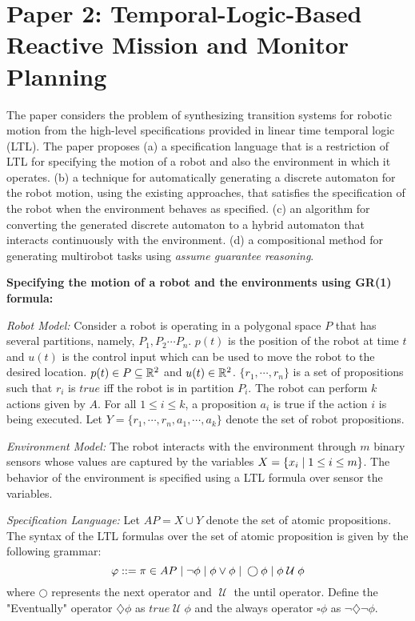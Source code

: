 \newcommand{\next}{\bigcirc}
\newcommand{\until}{\mathcal{\; U \;}}
\newcommand{\eventually}{\diamond}
\renewcommand{\eventually}{\diamondsuit}
\newcommand{\always}{\square}

\section{Paper 2: Temporal-Logic-Based Reactive Mission and Monitor Planning \cite{gazit:95}} \label{sec:paper2}

The paper considers the problem of synthesizing transition systems for robotic motion from the 
high-level specifications  provided in linear time temporal logic (LTL). The paper proposes  
(a) a specification language that is a restriction of LTL for specifying the motion of a robot
and also the environment in which it operates.  
(b) a technique for automatically generating a discrete automaton for the robot motion, using the 
existing approaches, that satisfies the specification of the robot when the environment behaves as specified. 
(c) an algorithm for converting the generated discrete automaton to a hybrid automaton that interacts 
continuously with the environment.
(d) a compositional method for generating multirobot tasks using \emph{assume guarantee reasoning}.

\textbf{Specifying the motion of a robot and the environments using GR(1) formula:}

\textit{Robot Model:} Consider a robot is operating in a polygonal space $P$ that 
has several partitions, namely, $P_1,P_2 \cdots P_n$. $p(t)$ is the position of the robot at time $t$
and $u(t)$ is the control input which can be used to move the robot to the desired location. 
$p(t) \in P \subseteq \mathbb{R}^2$ and $u(t) \in \mathbb{R}^2$. 
$\{ r_1,\cdots,r_n \}$ is a set of propositions such that $r_i$ is $true$ iff the robot is in  partition $P_i$.
The robot can perform $k$ actions given by $A$.  For all $1 \le i \le k$, a proposition $a_i$ is true if the
action $i$ is being executed.
Let $Y = \{ r_1,\cdots,r_n, a_1,\cdots,a_k \}$ denote the set of robot propositions.

\textit{Environment Model:}
The robot interacts with the environment through $m$ binary sensors whose values are captured by 
the variables $X = \{ x_i \; | \; 1 \le i \le m\}$. 
The behavior of the environment is specified using a LTL formula over sensor the variables.

\textit{Specification Language:} Let $AP = X \cup Y$  denote the set of atomic propositions.
The syntax of the LTL formulas over the set of atomic proposition is given by the following grammar:
\[ \varphi ::= \pi \in AP \vbar \neg \phi \vbar \phi \vee \phi \vbar  \next \phi \vbar \phi \until \phi  \]
where $\next$ represents the next operator and $\until$ the until operator.
Define  the "Eventually" operator $\eventually \phi$ as $true \until \phi$ and the 
always operator $\always \phi$ as $\neg \eventually \neg \phi$.

